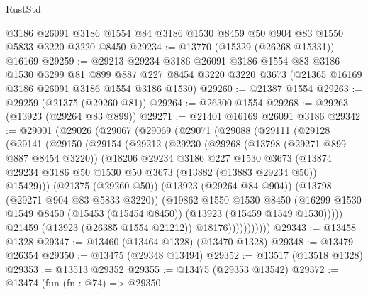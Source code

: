 \begin{lexlean}{RustStd}
\begin{coremodule}
    @3186
    @26091
    @3186
    @1554
    @84
    @3186
    @1530
    @8459
    @50
    @904
    @83
    @1550
    @5833
    @3220
    @3220
    @8450
@29234 := @13770 (@15329 (@26268 @15331)) @16169
@29259 := @29213
    @29234
    @3186
    @26091
    @3186
    @1554
    @83
    @3186
    @1530
    @3299
    @81
    @899
    @887
    @227
    @8454
    @3220
    @3220
    @3673
    (@21365 @16169 @3186 @26091 @3186 @1554 @3186 @1530)
@29260 := @21387 @1554
@29263 := @29259 (@21375 (@29260 @81))
@29264 := @26300 @1554
@29268 := @29263 (@13923 (@29264 @83 @899))
@29271 := @21401 @16169 @26091 @3186
@29342 := @29001
    (@29026
      (@29067
        (@29069
          (@29071
            (@29088
              (@29111
                (@29128
                  (@29141
                    (@29150
                      (@29154
                        (@29212
                          (@29230
                            (@29268
                              (@13798 (@29271 @899 @887 @8454 @3220))
                              (@18206
                                @29234
                                @3186
                                @227
                                @1530
                                @3673
                                (@13874
                                  @29234
                                  @3186
                                  @50
                                  @1530
                                  @50
                                  @3673
                                  (@13882 (@13883 @29234 @50))
                                  @15429)))
                            (@21375 (@29260 @50))
                            (@13923 (@29264 @84 @904))
                            (@13798 (@29271 @904 @83 @5833 @3220))
                            (@19862
                              @1550
                              @1530
                              @8450
                              (@16299
                                @1530
                                @1549
                                @8450
                                (@15453 (@15454 @8450))
                                (@13923 (@15459 @1549 @1530)))))
                          @21459
                          (@13923 (@26385 @1554 @21212))
                          @18176)))))))))))
@29343 := @13458 @1328
@29347 := @13460 (@13464 @1328) (@13470 @1328)
@29348 := @13479 @26354
@29350 := @13475 (@29348 @13494)
@29352 := @13517 (@13518 @1328)
@29353 := @13513 @29352
@29355 := @13475 (@29353 @13542)
@29372 := @13474
    (fun (fn : @74) =>
    @29350

\end{coremodule}
\end{lexlean}
